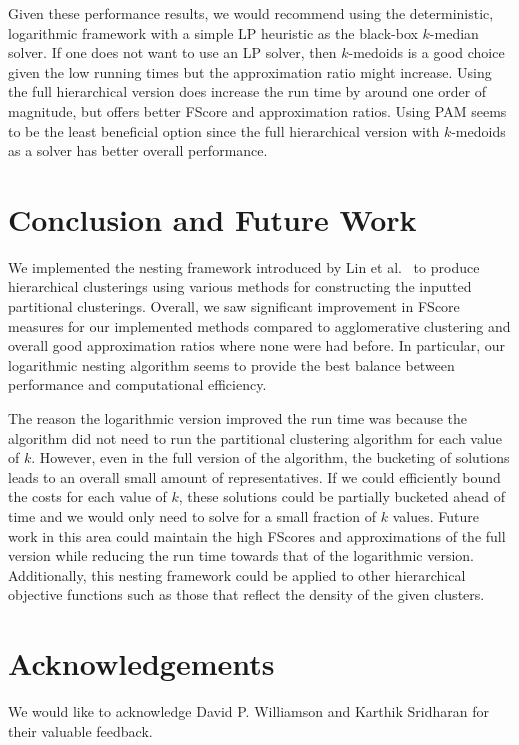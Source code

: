 \documentclass[conference, 10pt, final]{IEEEtran}
\begin{document}
Given these performance results, we would recommend using the deterministic, logarithmic framework with a simple LP heuristic as the black-box $k$-median solver. If one does not want to use an LP solver, then $k$-medoids is a good choice given the low running times but the approximation ratio might increase. Using the full hierarchical version does increase the run time by around one order of magnitude, but offers better FScore and approximation ratios. Using PAM seems to be the least beneficial option since the full hierarchical version with $k$-medoids as a solver has better overall performance.

\section{Conclusion and Future Work}
We implemented the nesting framework introduced by Lin et al.~\cite{Lin} to produce hierarchical clusterings using various methods for constructing the inputted partitional clusterings.  Overall, we saw significant improvement in FScore measures for our implemented methods compared to agglomerative clustering and overall good approximation ratios where none were had before. In particular, our logarithmic nesting algorithm seems to provide the best balance between performance and computational efficiency.

The reason the logarithmic version improved the run time was because the algorithm did not need to run the partitional clustering algorithm for each value of $k$. However, even in the full version of the algorithm, the bucketing of solutions leads to an overall small amount of representatives. If we could efficiently bound the costs for each value of $k$, these solutions could be partially bucketed ahead of time and we would only need to solve for a small fraction of $k$ values. Future work in this area could maintain the high FScores and approximations of the full version while reducing the run time towards that of the logarithmic version. Additionally, this nesting framework could be applied to other hierarchical objective functions such as those that reflect the density of the given clusters. 

\section*{Acknowledgements}
We would like to acknowledge David P. Williamson and Karthik Sridharan for their valuable feedback.






\end{document}
